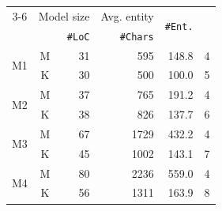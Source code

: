 \setlength{\tabcolsep}{3pt}
\begin{tabular}{|c|c|r|r|r|r|}
\cmidrule{3-6}
\multicolumn{2}{c|}{} & \multicolumn{2}{c|}{Model size} & Avg. entity & \multirow{2}{*}{\texttt{\#Ent.}} \\
\multicolumn{2}{c|}{} & \texttt{\#LoC} & \texttt{\#Chars} & \texttt{\#Chars} & \\
\hline
\multirow{2}{*}{M1} & M & 31 & 595 & 148.8 & 4 \\
\cmidrule{2-6}
 & K & 30 & 500 & 100.0 & 5 \\
\hline
\multirow{2}{*}{M2} & M & 37 & 765 & 191.2 & 4 \\
\cmidrule{2-6}
 & K & 38 & 826 & 137.7 & 6 \\
\hline
\multirow{2}{*}{M3} & M & 67 & 1729 & 432.2 & 4 \\
\cmidrule{2-6}
 & K & 45 & 1002 & 143.1 & 7 \\
\hline
\multirow{2}{*}{M4} & M & 80 & 2236 & 559.0 & 4 \\
\cmidrule{2-6}
 & K & 56 & 1311 & 163.9 & 8 \\
\hline
\end{tabular}

